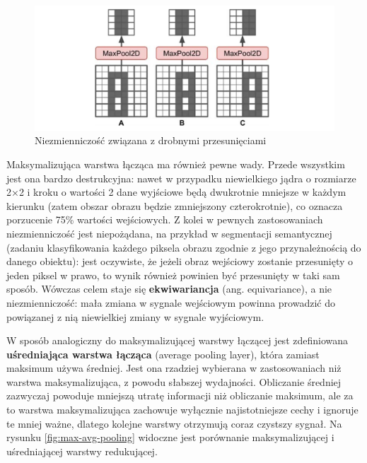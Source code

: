 \documentclass[12pt]{mwbk}
\theoremstyle{plain}
\theoremstyle{definition}
\theoremstyle{remark}
\newcommand\zrodlo[1]{\par\vspace{-3mm}{\small\textit{Źródło: }#1 }}
\begin{document}
\begin{figure}[!h]
	\centering
	\includegraphics[width=\linewidth]{rys/niezmienniczosc_pooling.png}
	\caption{Niezmienniczość związana z drobnymi przesunięciami}
	\zrodlo{\cite{geron}}
	\label{fig:niezmienniczosc-pooling}
\end{figure}



Maksymalizująca warstwa łącząca ma również pewne wady. Przede wszystkim jest
ona bardzo destrukcyjna: nawet w przypadku niewielkiego jądra o rozmiarze 2×2 i kroku o wartości 2
dane wyjściowe będą dwukrotnie mniejsze w każdym kierunku (zatem obszar obrazu będzie
zmniejszony czterokrotnie), co oznacza porzucenie 75\% wartości wejściowych. Z kolei w pewnych
zastosowaniach niezmienniczość jest niepożądana, na przykład w segmentacji semantycznej (zadaniu
klasyfikowania każdego piksela obrazu zgodnie z jego przynależnością do danego obiektu): jest oczywiste, że jeżeli obraz wejściowy zostanie przesunięty o jeden piksel w prawo, to wynik również powinien być przesunięty w taki sam sposób. Wówczas celem staje się \textbf{ekwiwariancja} (ang. equivariance), a nie niezmienniczość: mała zmiana w sygnale wejściowym powinna prowadzić do powiązanej z nią niewielkiej zmiany w sygnale wyjściowym.

W sposób analogiczny do maksymalizującej warstwy łączącej jest zdefiniowana \textbf{uśredniająca warstwa łącząca} (average pooling layer), która zamiast maksimum używa średniej. Jest ona rzadziej wybierana w zastosowaniach niż warstwa maksymalizująca, z powodu słabszej wydajności. Obliczanie średniej zazwyczaj powoduje mniejszą utratę informacji niż obliczanie maksimum, ale za to warstwa maksymalizująca zachowuje wyłącznie najistotniejsze cechy i ignoruje te mniej ważne, dlatego kolejne warstwy otrzymują coraz czystszy sygnał. Na rysunku \ref{fig:max-avg-pooling} widoczne jest porównanie maksymalizującej i uśredniającej warstwy redukującej.
\end{document}
